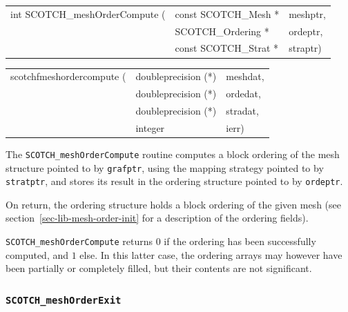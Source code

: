 \begin{itemize}
\progsyn

{\tt\begin{tabular}{l@{}ll}
int SCOTCH\_meshOrderCompute ( & const SCOTCH\_Mesh *  & meshptr, \\
                               & SCOTCH\_Ordering *    & ordeptr, \\
                               & const SCOTCH\_Strat * & straptr)
\end{tabular}}

{\tt\begin{tabular}{l@{}ll}
scotchfmeshordercompute ( & doubleprecision (*) & meshdat, \\
                          & doubleprecision (*) & ordedat, \\
                          & doubleprecision (*) & stradat, \\
                          & integer             & ierr)
\end{tabular}}

\progdes

The {\tt SCOTCH\_meshOrderCompute} routine computes a block ordering
of the mesh structure pointed to by {\tt grafptr}, using the mapping
strategy pointed to by {\tt stratptr}, and stores its result in the
ordering structure pointed to by {\tt ordeptr}.

On return, the ordering structure holds a block ordering of the
given mesh (see section~\ref{sec-lib-mesh-order-init} for a
description of the ordering fields).

\progret

{\tt SCOTCH\_meshOrderCompute} returns $0$ if the ordering has been
successfully computed, and $1$ else. In this latter case, the ordering
arrays may however have been partially or completely filled, but their
contents are not significant.
\end{itemize}

\subsubsection{{\tt SCOTCH\_meshOrderExit}}

